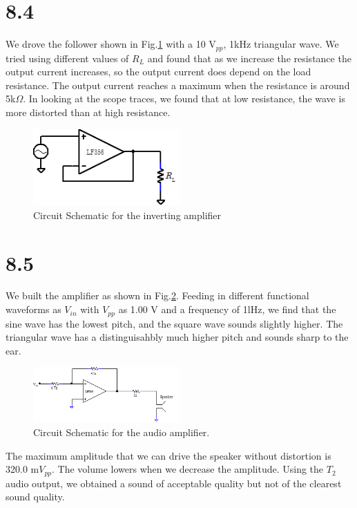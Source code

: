 \documentclass[authoryear, 12pt,5p, times]{elsarticle}
\begin{document}
 \section*{8.4}
 We drove the follower shown in Fig.\ref{8_4_schema} with a 10 V$_{pp}$, 1kHz triangular wave. We tried using different values of $R_L$ and found that as we increase the resistance the output current increases, so the output current does depend on the load resistance. The output current reaches a maximum when the resistance is around 5k$\Omega$. In looking at the scope traces, we found that at low resistance, the wave is more distorted than at high resistance. 
  \begin{figure}[h!]
 \centering
 \includegraphics[width=0.5\textwidth]{figure/8_4_schema.png}
\caption{Circuit Schematic for the inverting amplifier}
\label{8_4_schema}
 \end{figure}
  \section*{8.5}
 We built the amplifier as shown in Fig.\ref{8_5_schema}. Feeding in different functional waveforms as $V_{in}$ with $V_{pp}$ as 1.00 V and a frequency of 1lHz, we find  that the sine wave has the lowest pitch, and the square wave  sounds slightly higher. The triangular wave has a distinguisahbly much higher pitch and sounds sharp to the ear.
  \begin{figure}[h!]
 \centering
 \includegraphics[width=0.5\textwidth]{figure/8_5_schema.png}
\caption{Circuit Schematic for the audio amplifier.}
\label{8_5_schema}
 \end{figure}
 \par The maximum amplitude that we can drive the speaker without distortion is 320.0 m$V_{pp}$. The volume lowers when we decrease the amplitude. Using the $T_2$ audio output, we obtained a sound of acceptable quality but not of the clearest sound quality.
\end{document}
